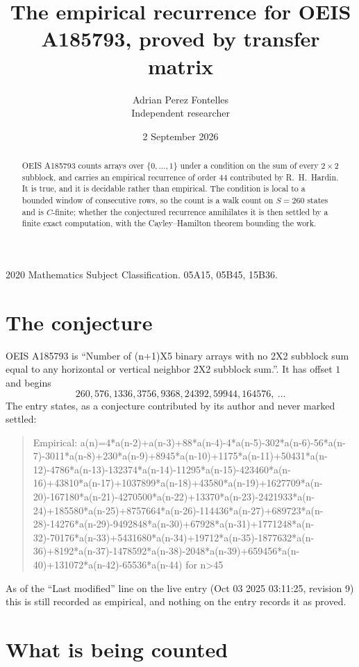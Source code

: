 \documentclass[11pt,a4paper]{article}
\title{The empirical recurrence for OEIS A185793, proved by transfer matrix}
\author{Adrian Perez Fontelles\\ \small Independent researcher}
\date{2 September 2026}
\theoremstyle{plain}
\theoremstyle{definition}
\begin{document}
\maketitle

\begin{abstract}
OEIS A185793 counts arrays over $\{0,\dots,1\}$ under a condition on the sum of every
$2\times2$ subblock, and carries an empirical recurrence of order $44$ contributed by
R.~H.~Hardin. It is true, and it is decidable rather than empirical. The condition is local to
a bounded window of consecutive rows, so the count is a walk count on $S=260$ states and is
$C$-finite; whether the conjectured recurrence annihilates it is then settled by a finite exact
computation, with the Cayley--Hamilton theorem bounding the work.
\end{abstract}

\noindent\small 2020 Mathematics Subject Classification. 05A15, 05B45, 15B36.\normalsize

\section{The conjecture}

OEIS A185793 is ``Number of (n+1)X5 binary arrays with no 2X2 subblock sum equal to any horizontal or vertical neighbor 2X2 subblock sum.''. It has offset $1$ and begins
\[
260, 576, 1336, 3756, 9368, 24392, 59944, 164576,\ \dots
\]
The entry states, as a conjecture contributed by its author and never marked settled:
\begin{quote}
Empirical: a(n)=4*a(n-2)+a(n-3)+88*a(n-4)-4*a(n-5)-302*a(n-6)-56*a(n-7)-3011*a(n-8)+230*a(n-9)+8945*a(n-10)+1175*a(n-11)+50431*a(n-12)-4786*a(n-13)-132374*a(n-14)-11295*a(n-15)-423460*a(n-16)+43810*a(n-17)+1037899*a(n-18)+43580*a(n-19)+1627709*a(n-20)-167180*a(n-21)-4270500*a(n-22)+13370*a(n-23)-2421933*a(n-24)+185580*a(n-25)+8757664*a(n-26)-114436*a(n-27)+689723*a(n-28)-14276*a(n-29)-9492848*a(n-30)+67928*a(n-31)+1771248*a(n-32)-70176*a(n-33)+5431680*a(n-34)+19712*a(n-35)-1877632*a(n-36)+8192*a(n-37)-1478592*a(n-38)-2048*a(n-39)+659456*a(n-40)+131072*a(n-42)-65536*a(n-44) for n>45
\end{quote}
As of the ``Last modified'' line on the live entry (Oct 03 2025 03:11:25, revision 9) this is still
recorded as empirical, and nothing on the entry records it as proved.

\section{What is being counted}
\end{document}
